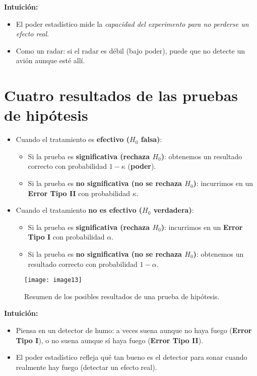 \documentclass[12pt]{article}
\begin{document}
\textbf{Intuición:}
\begin{itemize}
    \item El poder estadístico mide la \textit{capacidad del experimento para no perderse un efecto real}.
    \item Como un radar: si el radar es débil (bajo poder), puede que no detecte un avión aunque esté allí.
\end{itemize}

\section*{\noindent\textbf{Cuatro resultados de las pruebas de hipótesis}}

\begin{itemize}
    \item Cuando el tratamiento es \textbf{efectivo ($H_0$ falsa)}:
    \begin{itemize}
        \item Si la prueba es \textbf{significativa (rechaza $H_0$)}: obtenemos un resultado correcto con probabilidad $1-\kappa$ (\textbf{poder}).
        \item Si la prueba es \textbf{no significativa (no se rechaza $H_0$)}: incurrimos en un \textbf{Error Tipo II} con probabilidad $\kappa$.
    \end{itemize}
    \item Cuando el tratamiento \textbf{no es efectivo ($H_0$ verdadera)}:
    \begin{itemize}
        \item Si la prueba es \textbf{significativa (rechaza $H_0$)}: incurrimos en un \textbf{Error Tipo I} con probabilidad $\alpha$.
        \item Si la prueba es \textbf{no significativa (no se rechaza $H_0$)}: obtenemos un resultado correcto con probabilidad $1-\alpha$.
    \end{itemize}
\end{itemize}

\begin{figure}[H]
    \centering
    \texttt{[image: image13]}
    \caption{\footnotesize Resumen de los posibles resultados de una prueba de hipótesis.}
\end{figure}

\textbf{Intuición:}
\begin{itemize}
    \item Piensa en un detector de humo: a veces suena aunque no haya fuego (\textbf{Error Tipo I}), o no suena aunque sí haya fuego (\textbf{Error Tipo II}).
    \item El poder estadístico refleja qué tan bueno es el detector para sonar cuando realmente hay fuego (detectar un efecto real).
\end{itemize}
\end{document}
